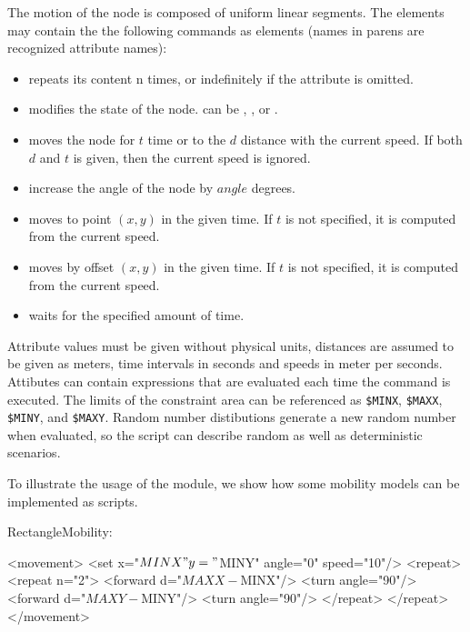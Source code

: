 The motion of the node is composed of uniform linear segments.
The  elements may contain the the following commands as
elements (names in parens are recognized attribute names):

\begin{itemize}
\item {} repeats its content n times, or indefinitely if
       the  attribute is omitted.
\item {} modifies the state of the node.
       can be , , 
      or .
\item {} moves the node for $t$ time or to the $d$ distance
      with the current speed. If both $d$ and $t$ is given, then the current
      speed is ignored.
\item {} increase the angle of the node by $angle$ degrees.
\item {} moves to point $(x,y)$ in the given time. If
      $t$ is not specified, it is computed from the current speed.
\item {} moves by offset $(x,y)$ in the given time. If
      $t$ is not specified, it is computed from the current speed.
\item {} waits for the specified amount of time.
\end{itemize}

Attribute values must be given without physical units, distances are assumed
to be given as meters, time intervals in seconds and speeds in meter per seconds.
Attibutes can contain expressions that are evaluated each time the
command is executed. The limits of the constraint area can be
referenced as \verb!$MINX!, \verb!$MAXX!, \verb!$MINY!, and \verb!$MAXY!.
Random number distibutions generate a new random number when evaluated,
so the script can describe random as well as deterministic scenarios.

To illustrate the usage of the module, we show how some mobility
models can be implemented as scripts.

RectangleMobility:

\begin{XML}
<movement>
    <set x="$MINX" y="$MINY" angle="0" speed="10"/>
    <repeat>
        <repeat n="2">
            <forward d="$MAXX-$MINX"/>
            <turn angle="90"/>
            <forward d="$MAXY-$MINY"/>
            <turn angle="90"/>
        </repeat>
    </repeat>
</movement>
\end{XML}

